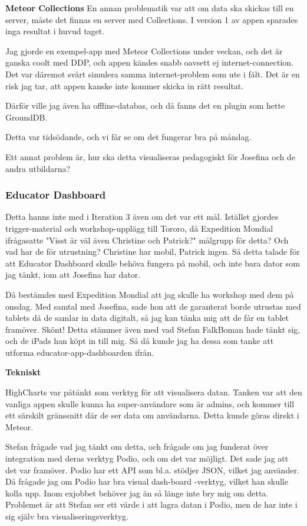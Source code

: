 \textbf{Meteor Collections}
En annan problematik var att om data ska skickas till en server, måste det finnas en server med Collections. I version 1 av appen sparades inga resultat i huvud taget.

Jag gjorde en exempel-app med Meteor Collections under veckan, och det är ganska coolt med DDP, och appen kändes snabb oavsett ej internet-connection. Det var däremot svårt simulera samma internet-problem som ute i fält. Det är en risk jag tar, att appen kanske inte kommer skicka in rätt resultat.

Därför ville jag även ha offline-databas, och då fanns det en plugin som hette GroundDB.

Detta var tidsödande, och vi får se om det fungerar bra på måndag.

Ett annat problem är, hur ska detta visualiseras pedagogiskt för Josefina och de andra utbildarna?

\subsubsection{Educator Dashboard}
Detta hanns inte med i Iteration 3 även om det var ett mål. Istället gjordes trigger-material och workshop-upplägg till Tororo, då Expedition Mondial ifrågasatte "Visst är väl även Christine och Patrick?" målgrupp för detta? Och vad har de för utrustning? Christine har mobil, Patrick ingen. Så detta talade för att Educator Dashboard skulle behöva fungera på mobil, och inte bara dator som jag tänkt, iom att Josefina har dator.

Då bestämdes med Expedition Mondial att jag skulle ha workshop med dem på onsdag. Med samtal med Josefina, sade hon att de garanterat borde utrustas med tablets då de samlar in data digitalt, så jag kan tänka mig att de får en tablet framöver. Skönt! Detta stämmer även med vad Stefan FalkBoman hade tänkt sig, och de iPads han köpt in till mig. Så då kunde jag ha dessa som tanke att utforma educator-app-dashboarden ifrån.

\textbf{Tekniskt}

HighCharts var påtänkt som verktyg för att visualisera datan. Tanken var att den vanliga appen skulle kunna ha super-användare som är admins, och kommer till ett särskilt gränssnitt där de ser data om användarna. Detta kunde göras direkt i Meteor.

Stefan frågade vad jag tänkt om detta, och frågade om jag funderat över integration med deras verktyg Podio, och om det var möjligt. Det sade jag att det var framöver. Podio har ett API som bl.a. stödjer JSON, vilket jag använder. Då frågade jag om Podio har bra visual dash-board -verktyg, vilket han skulle kolla upp. Inom exjobbet behöver jag än så länge inte bry mig om detta. Problemet är att Stefan ser ett värde i att lagra datan i Podio, men de har inte i sig själv bra visualiseringsverktyg.

